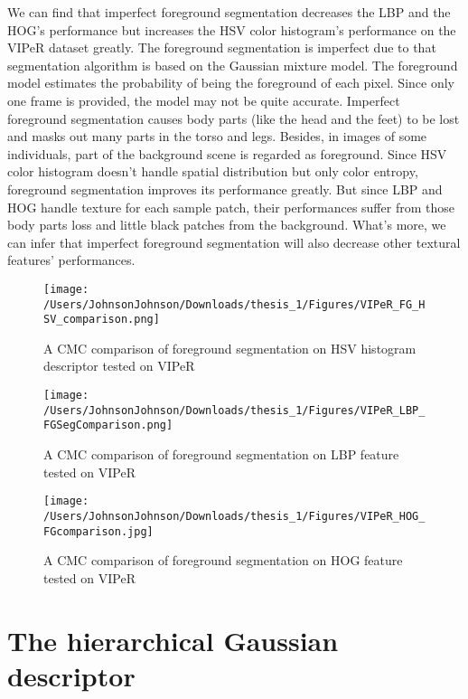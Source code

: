 We can find that imperfect foreground segmentation decreases the LBP and the HOG's performance but increases the HSV color histogram's performance on the VIPeR dataset greatly. The foreground segmentation is imperfect due to that segmentation algorithm is based on the Gaussian mixture model. The foreground model estimates the probability of being the foreground of each pixel. Since only one frame is provided, the model may not be quite accurate. Imperfect foreground segmentation causes body parts (like the head and the feet) to be lost and masks out many parts in the torso and legs. Besides, in images of some individuals, part of the background scene is regarded as foreground. Since HSV color histogram doesn't handle spatial distribution but only color entropy, foreground segmentation improves its performance greatly. But since LBP and HOG handle texture for each sample patch, their performances suffer from those body parts loss and little black patches from the background. What's more, we can infer that imperfect foreground segmentation will also decrease other textural features' performances.
\begin{figure}
\centering
\texttt{[image: /Users/JohnsonJohnson/Downloads/thesis\_1/Figures/VIPeR\_FG\_HSV\_comparison.png]}
\caption{A CMC comparison of foreground segmentation on HSV histogram descriptor tested on VIPeR}
\label{fig:SegHSV}
\vspace{-1em}
\end{figure} 

\begin{figure}
\centering
\texttt{[image: /Users/JohnsonJohnson/Downloads/thesis\_1/Figures/VIPeR\_LBP\_FGSegComparison.png]}
\caption{A CMC comparison of foreground segmentation on LBP feature tested on VIPeR }
\label{fig:SegLBP}
\vspace{-1em}
\end{figure} 

\begin{figure}
\centering
\texttt{[image: /Users/JohnsonJohnson/Downloads/thesis\_1/Figures/VIPeR\_HOG\_FGcomparison.jpg]}
\caption{A CMC comparison of foreground segmentation on HOG feature tested on VIPeR}
\label{fig:SegHOG}
\vspace{-1em}
\end{figure} 

\section{The hierarchical Gaussian descriptor}

